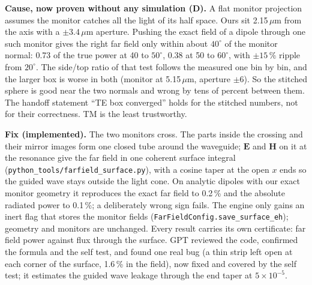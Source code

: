 \documentclass[11pt,a4paper]{article}
\begin{document}
\textbf{Cause, now proven without any simulation (D).} A flat monitor projection assumes the monitor catches all
the light of its half space. Ours sit 2.15\,$\mu$m from the axis with a $\pm3.4$\,$\mu$m aperture. Pushing the
exact field of a dipole through one such monitor gives the right far field only within about $40^\circ$ of the
monitor normal: 0.73 of the true power at 40 to $50^\circ$, 0.38 at 50 to $60^\circ$, with $\pm15\,\%$ ripple
from $20^\circ$. The side/top ratio of that test follows the measured one bin by bin, and the larger box is
worse in both (monitor at 5.15\,$\mu$m, aperture $\pm6$). So the stitched sphere is good near the two normals
and wrong by tens of percent between them. The handoff statement ``TE box converged'' holds for the stitched
numbers, not for their correctness. TM is the least trustworthy.

\textbf{Fix (implemented).} The two monitors cross. The parts inside the crossing and their mirror images form
one closed tube around the waveguide; $\mathbf E$ and $\mathbf H$ on it at the resonance give the far field in
one coherent surface integral (\texttt{python\_tools/farfield\_surface.py}), with a cosine taper at the open
$x$ ends so the guided wave stays outside the light cone. On analytic dipoles with our exact monitor geometry
it reproduces the exact far field to 0.2\,\% and the absolute radiated power to 0.1\,\%; a deliberately wrong
sign fails. The engine only gains an inert flag that stores the monitor fields
(\texttt{FarFieldConfig.save\_surface\_eh}); geometry and monitors are unchanged. Every result carries its own
certificate: far field power against flux through the surface. GPT reviewed the code, confirmed the formula
and the self test, and found one real bug (a thin strip left open at each corner of the surface, 1.6\,\% in the
field), now fixed and covered by the self test; it estimates the guided wave leakage through the end taper at
$5\times10^{-5}$.
\end{document}
